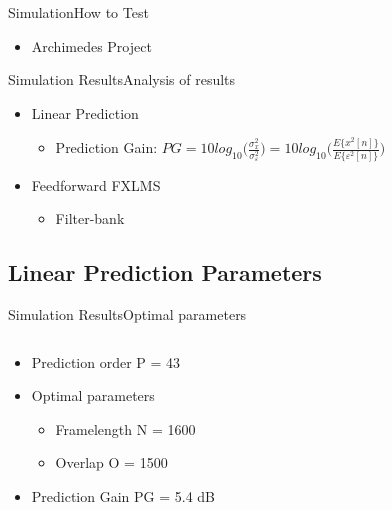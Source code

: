 \begin{frame}{Simulation}{How to Test}	
\begin{itemize}
	\item Archimedes Project		
\end{itemize}
\end{frame}


\begin{frame}{Simulation Results}{Analysis of results}	
\begin{itemize}
	\item Linear Prediction
	\begin{itemize}
		\item Prediction Gain: $PG = 10 log_{10}\bigg(\frac{\sigma^2_x}{\sigma^2_\varepsilon}\bigg) = 10 log_{10}\bigg(\frac{E\{x^2[n]\}}{E\{\varepsilon^2[n]\}}\bigg)$
	\end{itemize}
	\item Feedforward FXLMS
	\begin{itemize}
		\item Filter-bank
	\end{itemize}
\end{itemize}
\end{frame}


\subsection{Linear Prediction Parameters}
\begin{frame}{Simulation Results}{Optimal parameters}		
\begin{columns}
	\begin{column}{0.4\textwidth}
		\begin{itemize}
			\item Prediction order P = 43
			\item Optimal parameters
			\begin{itemize}
				\item Framelength N = 1600
				\item Overlap O = 1500
			\end{itemize}
			\item Prediction Gain PG = 5.4 dB
		\end{itemize}
	\end{column}
	\begin{column}{0.6\textwidth} 
		\resizebox{0.9\columnwidth}{!}{		
			}
	\end{column}
\end{columns}
\end{frame}

